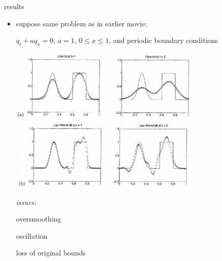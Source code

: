 \documentclass[10pt,hyperref]{beamer}
\begin{document}
\begin{frame}{results}

\begin{itemize}
\item suppose same problem as in earlier movie:

$q_t+a q_x=0$, $a=1$, $0\le x\le 1$, and periodic boundary conditions

\medskip
\hfill \includegraphics[width=0.72\textwidth]{figs/leveque6p1}

\vspace{-25mm}

\emph{issues:}

{\footnotesize oversmoothing}

{\footnotesize oscillation}

{\footnotesize loss of original bounds}
\end{itemize}
\end{frame}
\end{document}
